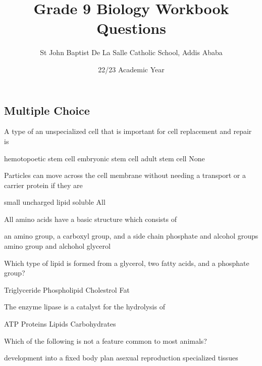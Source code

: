 \documentclass[12pt,addpoints]{exam}
\author{St John Baptist De La Salle Catholic School, Addis Ababa}
\date{22/23 Academic Year}
\begin{document}
	\title{Grade 9 Biology Workbook Questions}
	\maketitle
	\begin{center}
		\subsection*{Multiple Choice}
	\end{center}
	\begin{questions}
		\question A type of an unspecialized cell that is important for cell replacement and repair is \\
		\begin{oneparchoices}
			\choice hemotopoetic stem cell
			\choice embryonic stem cell
			\choice adult stem cell
			\choice None
		\end{oneparchoices}
		\question Particles can move across the cell membrane without needing a transport or a carrier protein if they are \\
		\begin{oneparchoices}
			\choice small
			\choice uncharged
			\choice lipid soluble
			\choice All
		\end{oneparchoices}
		\question All amino acids have a basic structure which consists of \\
		\begin{choices}
			\choice an amino group, a carboxyl group, and a side chain
			\choice phosphate and alcohol groups
			\choice amino group and alchohol
			\choice glycerol
		\end{choices}	
		\question Which type of lipid is formed from a glycerol, two fatty acids, and a phosphate group? \\
		\begin{oneparchoices}
			\choice Triglyceride
			\choice Phospholipid
			\choice Cholestrol
			\choice Fat
		\end{oneparchoices}
		\question The enzyme lipase is a catalyst for the hydrolysis of \\ 
		\begin{oneparchoices}
			\choice ATP
			\choice Proteins
			\choice Lipids
			\choice Carbohydrates
		\end{oneparchoices}
		\question Which of the following is not a feature common to most animals?
		\begin{choices}
			\choice development into a fixed body plan
			\choice asexual reproduction
			\choice specialized tissues

\end{choices}
\end{questions}
\end{document}
